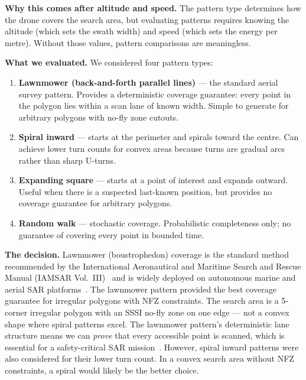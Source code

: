 \documentclass[10pt,a4paper]{article}
\begin{document}
\textbf{Why this comes after altitude and speed.} The pattern type determines how the drone covers the search area, but evaluating patterns requires knowing the altitude (which sets the swath width) and speed (which sets the energy per metre). Without those values, pattern comparisons are meaningless.

\textbf{What we evaluated.} We considered four pattern types:

\begin{enumerate}[nosep]
  \item \textbf{Lawnmower (back-and-forth parallel lines)} --- the standard aerial survey pattern. Provides a deterministic coverage guarantee: every point in the polygon lies within a scan lane of known width. Simple to generate for arbitrary polygons with no-fly zone cutouts.
  \item \textbf{Spiral inward} --- starts at the perimeter and spirals toward the centre. Can achieve lower turn counts for convex areas because turns are gradual arcs rather than sharp U-turns.
  \item \textbf{Expanding square} --- starts at a point of interest and expands outward. Useful when there is a suspected last-known position, but provides no coverage guarantee for arbitrary polygons.
  \item \textbf{Random walk} --- stochastic coverage. Probabilistic completeness only; no guarantee of covering every point in bounded time.
\end{enumerate}

\textbf{The decision.} Lawnmower (boustrophedon) coverage is the standard method recommended by the International Aeronautical and Maritime Search and Rescue Manual (IAMSAR Vol.~III)~\cite{wca1981} and is widely deployed on autonomous marine and aerial SAR platforms~\cite{galceran2013survey,choset2001coverage}. The lawnmower pattern provided the best coverage guarantee for irregular polygons with NFZ constraints. The search area is a 5-corner irregular polygon with an SSSI no-fly zone on one edge --- not a convex shape where spiral patterns excel. The lawnmower pattern's deterministic lane structure means we can \emph{prove} that every accessible point is scanned, which is essential for a safety-critical SAR mission~\cite{murphy2014}. However, spiral inward patterns were also considered for their lower turn count. In a convex search area without NFZ constraints, a spiral would likely be the better choice.


\end{document}
